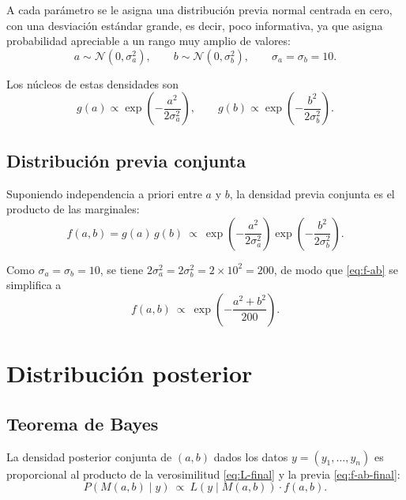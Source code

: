 \documentclass[11pt]{article}
\theoremstyle{remark}
\begin{document}
A cada parámetro se le asigna una distribución previa normal centrada en
cero, con una desviación estándar grande, es decir, poco informativa, ya que
asigna probabilidad apreciable a un rango muy amplio de valores:
\begin{equation}
a \sim \mathcal{N}(0,\sigma_a^2), \qquad b\sim\mathcal N(0,\sigma_b^2),
\qquad \sigma_a=\sigma_b=10.
\label{eq:prior-ab}
\end{equation}

Los núcleos de estas densidades son
\begin{equation}
g(a)\propto\exp\!\left(-\frac{a^2}{2\sigma_a^2}\right), \qquad
g(b)\propto\exp\!\left(-\frac{b^2}{2\sigma_b^2}\right).
\label{eq:g-ab}
\end{equation}

\subsection{Distribución previa conjunta}

Suponiendo independencia a priori entre $a$ y $b$, la densidad previa
conjunta es el producto de las marginales:
\begin{equation}
f(a,b) = g(a)\,g(b) \ \propto\ \exp\!\left(-\frac{a^2}{2\sigma_a^2}\right)
\exp\!\left(-\frac{b^2}{2\sigma_b^2}\right).
\label{eq:f-ab}
\end{equation}

Como $\sigma_a=\sigma_b=10$, se tiene $2\sigma_a^2=2\sigma_b^2=2\times10^2=200$,
de modo que \eqref{eq:f-ab} se simplifica a
\begin{equation}
f(a,b)\ \propto\ \exp\!\left(-\frac{a^2+b^2}{200}\right).
\label{eq:f-ab-final}
\end{equation}

\section{Distribución posterior}

\subsection{Teorema de Bayes}

La densidad posterior conjunta de $(a,b)$ dados los datos $y=(y_1,\dots,y_n)$
es proporcional al producto de la verosimilitud \eqref{eq:L-final} y la
previa \eqref{eq:f-ab-final}:
\begin{equation}
P(M(a,b)\mid y) \ \propto\ L(y\mid M(a,b))\cdot f(a,b).
\label{eq:bayes}
\end{equation}
\end{document}
